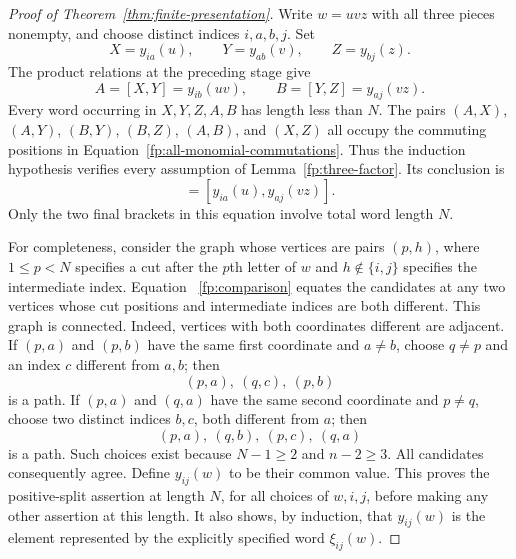 \begin{proof}[Proof of Theorem~\ref{thm:finite-presentation}]
Write $w=uvz$ with all three pieces nonempty, and choose distinct
indices $i,a,b,j$.  Set
\[
 X=y_{ia}(u),\qquad Y=y_{ab}(v),\qquad Z=y_{bj}(z).
\]
The product relations at the preceding stage give
\[
 A=[X,Y]=y_{ib}(uv),\qquad
 B=[Y,Z]=y_{aj}(vz).
\]
Every word occurring in $X,Y,Z,A,B$ has length less than $N$.
The pairs $(A,X)$, $(A,Y)$, $(B,Y)$, $(B,Z)$, $(A,B)$, and
$(X,Z)$ all occupy the commuting positions in
Equation~\eqref{fp:all-monomial-commutations}.  Thus the induction
hypothesis verifies every assumption of Lemma~\ref{fp:three-factor}.
Its conclusion is
\begin{equation}
 [y_{ib}(uv),y_{bj}(z)]
 =
 [y_{ia}(u),y_{aj}(vz)].
 \label{fp:comparison}
\end{equation}
Only the two final brackets in this equation involve total word length
$N$.

For completeness, consider the graph whose vertices are pairs $(p,h)$,
where $1\leq p<N$ specifies a cut after the $p$th letter of $w$ and
$h\notin\{i,j\}$ specifies the intermediate index.  Equation~
\eqref{fp:comparison} equates the candidates at any two vertices whose
cut positions and intermediate indices are both different.  This graph
is connected.  Indeed, vertices with both coordinates different are
adjacent.  If $(p,a)$ and $(p,b)$ have the same first coordinate and
$a\neq b$, choose $q\neq p$ and an index $c$ different from $a,b$;
then
\[
 (p,a),\ (q,c),\ (p,b)
\]
is a path.  If $(p,a)$ and $(q,a)$ have the same second coordinate and
$p\neq q$, choose two distinct indices $b,c$, both different from $a$;
then
\[
 (p,a),\ (q,b),\ (p,c),\ (q,a)
\]
is a path.  Such choices exist because $N-1\geq2$ and $n-2\geq3$.
All candidates consequently agree.  Define $y_{ij}(w)$ to be their
common value.  This proves the positive-split assertion at length $N$,
for all choices of $w,i,j$, before making any other assertion at this
length.  It also shows, by induction, that $y_{ij}(w)$ is the element
represented by the explicitly specified word $\xi_{ij}(w)$.


\end{proof}
